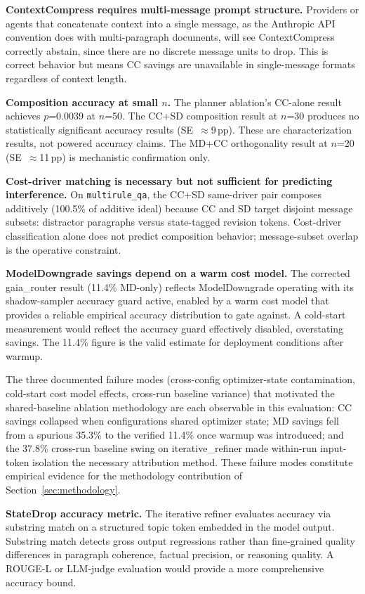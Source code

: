 \textbf{ContextCompress requires multi-message prompt structure.} Providers or agents
that concatenate context into a single message, as the Anthropic API convention does
with multi-paragraph documents, will see ContextCompress correctly abstain, since
there are no discrete message units to drop. This is correct behavior but means CC
savings are unavailable in single-message formats regardless of context length.

\textbf{Composition accuracy at small $n$.} The planner ablation's CC-alone result
achieves $p$=0.0039 at $n$=50. The CC+SD composition result at $n$=30 produces no
statistically significant accuracy results (SE~$\approx$9\,pp). These are
characterization results, not powered accuracy claims. The MD+CC orthogonality result
at $n$=20 (SE~$\approx$11\,pp) is mechanistic confirmation only.

\textbf{Cost-driver matching is necessary but not sufficient for predicting
interference.} On \texttt{multirule\_qa}, the CC+SD same-driver pair composes
additively (100.5\% of additive ideal) because CC and SD target disjoint message
subsets: distractor paragraphs versus state-tagged revision tokens. Cost-driver
classification alone does not predict composition behavior; message-subset overlap is
the operative constraint.

\textbf{ModelDowngrade savings depend on a warm cost model.} The corrected
gaia\_router result (11.4\% MD-only) reflects ModelDowngrade operating with its
shadow-sampler accuracy guard active, enabled by a warm cost model that provides a
reliable empirical accuracy distribution to gate against. A cold-start measurement
would reflect the accuracy guard effectively disabled, overstating savings. The 11.4\%
figure is the valid estimate for deployment conditions after warmup.

The three documented failure modes (cross-config optimizer-state contamination,
cold-start cost model effects, cross-run baseline variance) that motivated the
shared-baseline ablation methodology are each observable in this evaluation: CC
savings collapsed when configurations shared optimizer state; MD savings fell from a
spurious 35.3\% to the verified 11.4\% once warmup was introduced; and the 37.8\%
cross-run baseline swing on iterative\_refiner made within-run input-token isolation
the necessary attribution method. These failure modes constitute empirical evidence for
the methodology contribution of Section~\ref{sec:methodology}.

\textbf{StateDrop accuracy metric.} The iterative refiner evaluates accuracy via
substring match on a structured topic token embedded in the model output. Substring
match detects gross output regressions rather than fine-grained quality differences in
paragraph coherence, factual precision, or reasoning quality. A ROUGE-L or LLM-judge
evaluation would provide a more comprehensive accuracy bound.


